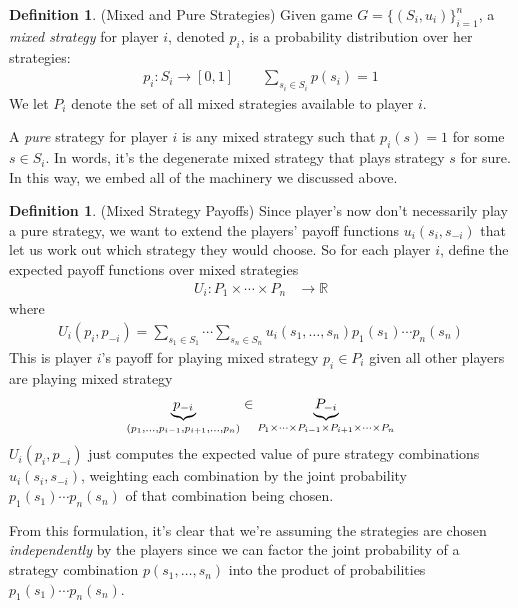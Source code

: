 \documentclass[12pt]{article}
\theoremstyle{plain}
\theoremstyle{definition}
\newtheorem{defn}[thm]{Definition}
\theoremstyle{remark}
\newcommand{\ra}{\rightarrow}
\newcommand{\R}{\mathbb{R}}
\begin{document}
\begin{defn}(Mixed and Pure Strategies)
Given game $G=\{(S_i,u_i)\}^n_{i=1}$, a \emph{mixed strategy} for player
$i$, denoted $p_i$, is a probability distribution over her strategies:
\begin{align*}
  p_i:S_i \ra [0,1]
  \qquad \sum_{s_i\in S_i} p(s_i) = 1
\end{align*}
We let $P_i$ denote the set of all mixed strategies available to
player $i$.

A \emph{pure} strategy for player $i$ is any mixed strategy such that
$p_i(s)=1$ for some $s \in S_i$. In words, it's the degenerate mixed
strategy that plays strategy $s$ for sure. In this way, we embed all of
the machinery we discussed above.
\end{defn}

\begin{defn}(Mixed Strategy Payoffs)
Since player's now don't necessarily play a pure strategy, we want to
extend the players' payoff functions $u_i(s_i,s_{-i})$ that let us work
out which strategy they would choose. So for each player $i$, define the
expected payoff functions over mixed strategies
\begin{align*}
  U_i:P_1\times\cdots\times P_n &\ra \R
\end{align*}
where
\begin{align*}
  U_i(p_i,p_{-i}) =
  \sum_{s_1\in S_1}
  \cdots
  \sum_{s_n\in S_n}
  u_i(s_1, \ldots, s_{n})
  p_1(s_1)
  \cdots
  p_n(s_n)
\end{align*}
This is player $i$'s payoff for playing mixed strategy $p_i\in P_i$
given all other players are playing mixed strategy
\begin{align*}
  \underbrace{%
    p_{-i}
  }_{(p_1,\ldots, p_{i-1}, p_{i+1},\ldots, p_n)}
  \in
  \underbrace{%
  P_{-i}
  }_{P_1\times\cdots\times P_{i-1} \times P_{i+1} \times\cdots \times P_n}
\end{align*}
$U_i(p_i,p_{-i})$ just computes the expected value of pure strategy
combinations $u_i(s_i,s_{-i})$, weighting each combination by the
joint probability $p_1(s_1)\cdots p_n(s_n)$ of that combination being
chosen.

From this formulation, it's clear that we're assuming the strategies are
chosen \emph{independently} by the players since we can factor the joint
probability of a strategy combination $p(s_1,\ldots,s_n)$ into
the product of probabilities $p_1(s_1)\cdots p_n(s_n)$.
\end{defn}
\end{document}
